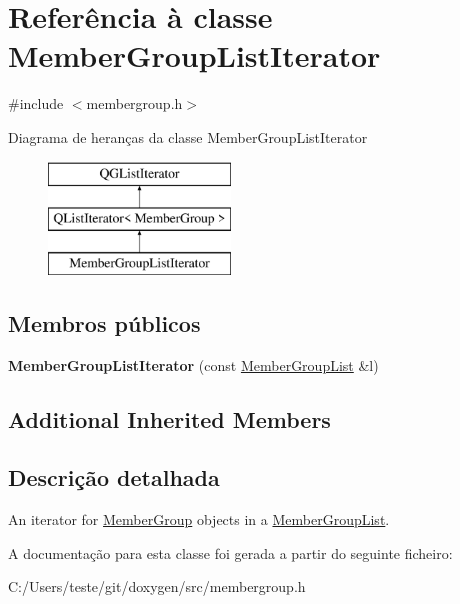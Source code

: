 \hypertarget{class_member_group_list_iterator}{\section{Referência à classe Member\-Group\-List\-Iterator}
\label{class_member_group_list_iterator}
}


{\ttfamily \#include $<$membergroup.\-h$>$}

Diagrama de heranças da classe Member\-Group\-List\-Iterator\begin{figure}[H]
\begin{center}
\leavevmode
\includegraphics[height=3.000000cm]{class_member_group_list_iterator}
\end{center}
\end{figure}
\subsection*{Membros públicos}
\begin{DoxyCompactItemize}
\item 
\hypertarget{class_member_group_list_iterator_aab389284cac00526214a6ccf178c25bd}{{\bfseries Member\-Group\-List\-Iterator} (const \hyperlink{class_member_group_list}{Member\-Group\-List} \&l)}\label{class_member_group_list_iterator_aab389284cac00526214a6ccf178c25bd}

\end{DoxyCompactItemize}
\subsection*{Additional Inherited Members}


\subsection{Descrição detalhada}
An iterator for \hyperlink{class_member_group}{Member\-Group} objects in a \hyperlink{class_member_group_list}{Member\-Group\-List}. 

A documentação para esta classe foi gerada a partir do seguinte ficheiro\-:\begin{DoxyCompactItemize}
\item 
C\-:/\-Users/teste/git/doxygen/src/membergroup.\-h\end{DoxyCompactItemize}
